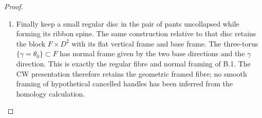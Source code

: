 \begin{proof}
\begin{enumerate}[label=\arabic*.,leftmargin=*]
\item Finally keep a small regular disc in the pair of
pants uncollapsed while forming its ribbon spine.
The same construction relative to that disc retains
the block $F\times D^2$ with its flat vertical
frame and base frame.  The three-torus
$\{\gamma=\theta_0\}\subset F$ has normal frame
given by the two base directions and the
$\gamma$ direction.  This is exactly the regular
fibre and normal framing of B.1.  The CW
presentation therefore retains the geometric
framed fibre; no smooth framing of hypothetical
cancelled handles has been inferred from the
homology calculation.
\end{enumerate}
\end{proof}

